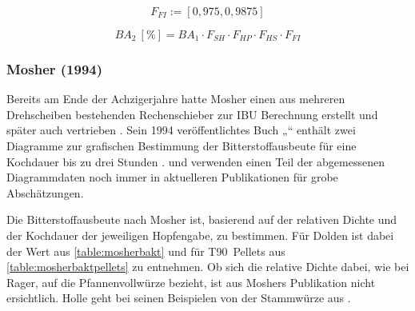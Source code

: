 \documentclass[a4paper,parskip=half]{scrartcl}
\newcommand{\BA}{\mathit{BA}}
\newcommand{\uper}{\:[\text{\%}]}
\newcommand{\FAH}{F_{\mathit{SH}}}
\newcommand{\FHF}{F_{\mathit{HP}}}
\newcommand{\FHS}{F_{\mathit{HS}}}
\newcommand{\FFil}{F_{\mathit{FI}}}
\begin{document}
\begin{equation}
\FFil := \left[0,975, 0,9875 \right]
\label{eq:garetzfil}
\end{equation}

\begin{equation}
\BA_2 \uper = BA_1 \cdot \FAH \cdot \FHF \cdot \FHS \cdot \FFil
\label{eq:garetzba2}
\end{equation}

\subsubsection*{Mosher (1994)}

Bereits am Ende der Achzigerjahre hatte Mosher einen aus mehreren Drehscheiben bestehenden Rechenschieber zur IBU Berechnung erstellt und später auch vertrieben \parencite{Mosher2022}. Sein 1994 veröffentlichtes Buch „“ enthält zwei Diagramme zur grafischen Bestimmung der Bitterstoffausbeute für eine Kochdauer bis zu drei Stunden \parencite[160\psq]{Mosher1994}. \textcite{Holle2010} und \textcite{Thesseling2019} verwenden einen Teil der abgemessenen Diagrammdaten noch immer in aktuelleren Publikationen für grobe Abschätzungen.

Die Bitterstoffausbeute nach Mosher ist, basierend auf der relativen Dichte und der Kochdauer der jeweiligen Hopfengabe, zu bestimmen. Für Dolden ist dabei der Wert aus \autoref{table:mosherbakt} und für T90~Pellets aus \autoref{table:mosherbaktpellets} zu entnehmen. Ob sich die relative Dichte dabei, wie bei Rager, auf die Pfannenvollwürze bezieht, ist aus Moshers Publikation nicht ersichtlich. Holle geht bei seinen Beispielen von der Stammwürze aus \parencite[53]{Holle2010}.
\end{document}
